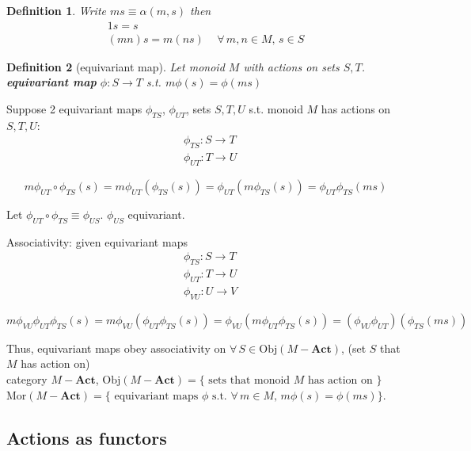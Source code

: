 \documentclass[10pt]{amsart}
\newtheorem{definition}{Definition}
\begin{document}
\begin{multicols*}{2}
\begin{definition}
Write $ms \equiv \alpha(m, s)$ then 
\[
\begin{gathered} 
1s = s \\
(mn) s = m (ns) \quad \, \forall \, m, n \in M, \, s \in S
\end{gathered}
\]
\end{definition}

\begin{definition}[equivariant map]
	Let monoid $M$ with actions on sets $S,T$. \\
	\textbf{equivariant map} $\phi:S \to T$ s.t. $m\phi(s) = \phi(ms)$
\end{definition}

Suppose 2 equivariant maps $\phi_{TS}$, $\phi_{UT}$, sets $S,T,U$ s.t. monoid $M$ has actions on $S,T,U$: 
\[
\begin{aligned}
& \phi_{TS} : S \to T \\ 
& \phi_{UT} : T \to U
\end{aligned}
\]

\[
m\phi_{UT} \circ \phi_{TS}(s) = m \phi_{UT}(\phi_{TS}(s)) = \phi_{UT}(m\phi_{TS}(s)) = \phi_{UT} \phi_{TS} (ms) 
\]

Let $\phi_{UT} \circ \phi_{TS} \equiv \phi_{US}$. $\phi_{US}$ equivariant.

Associativity: given equivariant maps 
\[
\begin{aligned}
& \phi_{TS} : S \to T \\ 
& \phi_{UT} : T \to U \\ 
& \phi_{VU} : U \to V 
\end{aligned}
\]

\[
m \phi_{VU} \phi_{UT} \phi_{TS}(s) = m \phi_{VU} (\phi_{UT} \phi_{TS}(s)) = \phi_{VU} (m \phi_{UT} \phi_{TS}(s)) = (\phi_{VU} \phi_{UT}) (\phi_{TS}(ms))
\]

Thus, equivariant maps obey associativity on $\forall \, S \in \text{Obj}(M-\mathbf{Act})$, (set $S$ that $M$ has action on) \\
category $M-\mathbf{Act}$, $\text{Obj}(M-\mathbf{Act}) = \lbrace \text{ sets that monoid $M$ has action on }\rbrace$ \\
 $\text{Mor}(M-\mathbf{Act}) = \lbrace \text{ equivariant maps $\phi$ s.t. } \forall \, m \in M, \, m\phi(s) = \phi(ms) \rbrace$.

\subsection{Actions as functors}


\end{multicols*}
\end{document}
